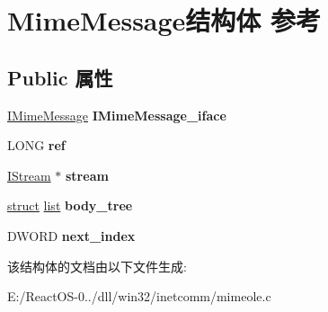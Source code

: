 \hypertarget{struct_mime_message}{}\section{Mime\+Message结构体 参考}
\label{struct_mime_message}
\subsection*{Public 属性}
\begin{DoxyCompactItemize}
\item 
\mbox{\label{struct_mime_message_a2b3d906241d194a35d10115eb4b28c8a}} 
\hyperlink{class_i_mime_message}{I\+Mime\+Message} {\bfseries I\+Mime\+Message\+\_\+iface}
\item 
\mbox{\label{struct_mime_message_a4231f356fbdad1cb0c3d31a96326ac9f}} 
L\+O\+NG {\bfseries ref}
\item 
\mbox{\label{struct_mime_message_af1d123281210f844e95d1e24603c824c}} 
\hyperlink{interface_i_stream}{I\+Stream} $\ast$ {\bfseries stream}
\item 
\mbox{\label{struct_mime_message_af50d367547c1625e453a52c29e7e55fd}} 
\hyperlink{interfacestruct}{struct} \hyperlink{classlist}{list} {\bfseries body\+\_\+tree}
\item 
\mbox{\label{struct_mime_message_a2ff9963e05d420d58bb142b5056539f3}} 
D\+W\+O\+RD {\bfseries next\+\_\+index}
\end{DoxyCompactItemize}


该结构体的文档由以下文件生成\+:\begin{DoxyCompactItemize}
\item 
E\+:/\+React\+O\+S-\/0../dll/win32/inetcomm/mimeole.\+c\end{DoxyCompactItemize}
